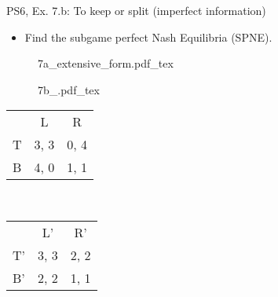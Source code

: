 \begin{frame}{PS6, Ex. 7.b: To keep or split (imperfect information)}
  \begin{itemize}
    \item[(b)] Find the subgame perfect Nash Equilibria (SPNE).
  \end{itemize}
  \vspace{-4pt}
  \begin{figure}[!h]
    \center
    \def\svgwidth{.8\columnwidth}
    {7a_extensive_form.pdf_tex}
  \end{figure}
  \vspace{-2pt}
  \begin{multicols}{2}
    \begin{figure}[!h]
      \center
      \def\svgwidth{.5\columnwidth}
      {7b_.pdf_tex}
    \end{figure}
    \vspace{-8pt}
    \begin{table}
      \begin{tabular}{l|c|c|}
        \multicolumn{1}{c}{} & \multicolumn{1}{c}{L} & \multicolumn{1}{c}{R} \\\cline{2-3}
        T & 3, 3 & 0, 4 \\\cline{2-3}
        B & 4, 0 & 1, 1 \\\cline{2-3}
      \end{tabular}\
      \begin{tabular}{l|c|c|}
        \multicolumn{1}{c}{} & \multicolumn{1}{c}{L'} & \multicolumn{1}{c}{R'} \\\cline{2-3}
        T' & 3, 3 & 2, 2 \\\cline{2-3}
        B' & 2, 2 & 1, 1 \\\cline{2-3}
      \end{tabular}
    \end{table}
  \vfill\null \columnbreak
  \vfill\null
  \end{multicols}
\end{frame}
